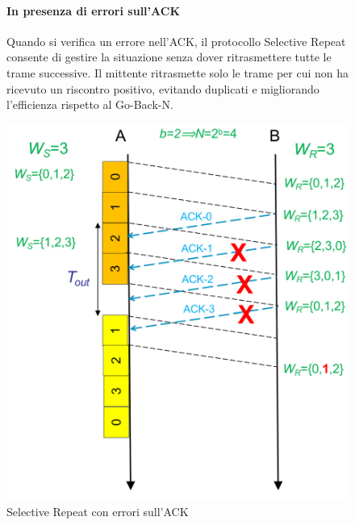 \begin{figure}[htbp]
    \centering
    \begin{minipage}{0.5\textwidth}
        \paragraph{In presenza di errori sull'ACK}
        Quando si verifica un errore nell'ACK, il protocollo Selective Repeat consente di gestire la situazione senza dover ritrasmettere tutte le trame successive. 
        Il mittente ritrasmette solo le trame per cui non ha ricevuto un riscontro positivo, evitando duplicati e migliorando l'efficienza rispetto al Go-Back-N.
    \end{minipage}%
    \hfill
    \begin{minipage}{0.47\textwidth}
        \includegraphics[width=\linewidth]{images/srequivocazione.png}
        \caption{Selective Repeat con errori sull'ACK}
    \end{minipage}
\end{figure}